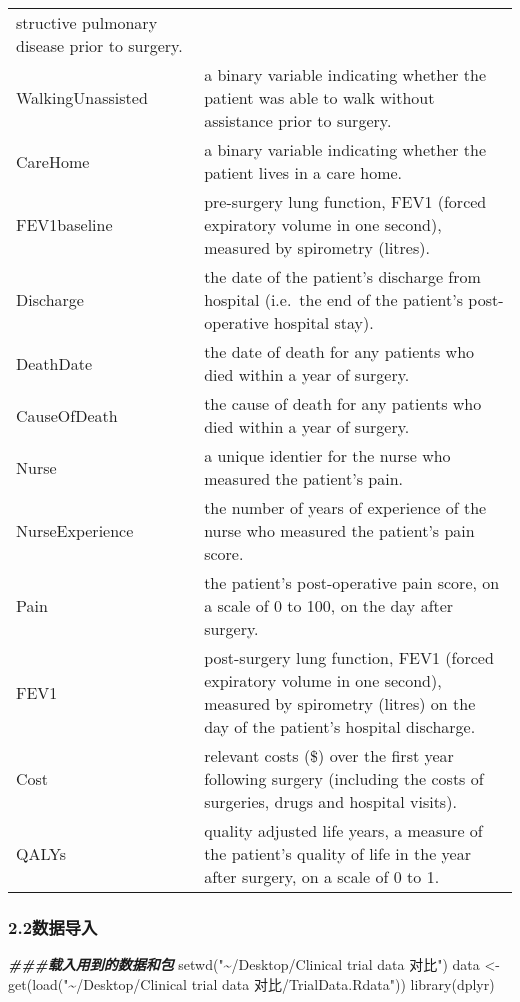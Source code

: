 \documentclass[
]{article}
\newenvironment{Shaded}{\begin{snugshade}}{\end{snugshade}}
\newcommand{\DocumentationTok}[1]{\textcolor[rgb]{0.56,0.35,0.01}{\textbf{\textit{#1}}}}
\newcommand{\FunctionTok}[1]{\textcolor[rgb]{0.00,0.00,0.00}{#1}}
\newcommand{\NormalTok}[1]{#1}
\newcommand{\OtherTok}[1]{\textcolor[rgb]{0.56,0.35,0.01}{#1}}
\newcommand{\StringTok}[1]{\textcolor[rgb]{0.31,0.60,0.02}{#1}}
\begin{document}
\begin{longtable}[]{@{}
  >{\raggedright\arraybackslash}p{}
  >{\raggedright\arraybackslash}p{}@{}}
structive pulmonary disease prior to surgery. \\
WalkingUnassisted & a binary variable indicating whether the patient was
able to walk without assistance prior to surgery. \\
CareHome & a binary variable indicating whether the patient lives in a
care home. \\
FEV1baseline & pre-surgery lung function, FEV1 (forced expiratory volume
in one second), measured by spirometry (litres). \\
Discharge & the date of the patient's discharge from hospital (i.e.~the
end of the patient's post-operative hospital stay). \\
DeathDate & the date of death for any patients who died within a year of
surgery. \\
CauseOfDeath & the cause of death for any patients who died within a
year of surgery. \\
Nurse & a unique identier for the nurse who measured the patient's
pain. \\
NurseExperience & the number of years of experience of the nurse who
measured the patient's pain score. \\
Pain & the patient's post-operative pain score, on a scale of 0 to 100,
on the day after surgery. \\
FEV1 & post-surgery lung function, FEV1 (forced expiratory volume in one
second), measured by spirometry (litres) on the day of the patient's
hospital discharge. \\
Cost & relevant costs (\$) over the first year following surgery
(including the costs of surgeries, drugs and hospital visits). \\
QALYs & quality adjusted life years, a measure of the patient's quality
of life in the year after surgery, on a scale of 0 to 1. \\
\bottomrule
\end{longtable}

\hypertarget{ux6570ux636eux5bfcux5165}{%
\subsubsection{2.2数据导入}\label{ux6570ux636eux5bfcux5165}}

\begin{Shaded}
\begin{Highlighting}[]
\DocumentationTok{\#\#\#载入用到的数据和包}
\FunctionTok{setwd}\NormalTok{(}\StringTok{"\textasciitilde{}/Desktop/Clinical trial data 对比"}\NormalTok{)}
\NormalTok{data }\OtherTok{\textless{}{-}} \FunctionTok{get}\NormalTok{(}\FunctionTok{load}\NormalTok{(}\StringTok{"\textasciitilde{}/Desktop/Clinical trial data 对比/TrialData.Rdata"}\NormalTok{))}
\FunctionTok{library}\NormalTok{(dplyr)}
\end{Highlighting}
\end{Shaded}
\end{document}
